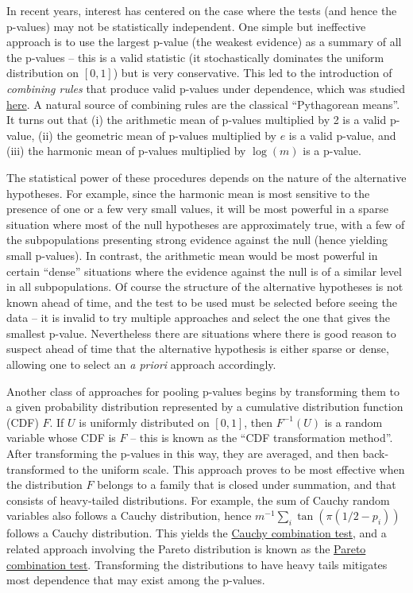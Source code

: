 In recent years, interest has centered on the case where the tests (and hence the p-values) may not be statistically independent. One simple but ineffective approach is to use the largest p-value (the weakest evidence) as a summary of all the p-values -- this is a valid statistic (it stochastically dominates the uniform distribution on $[0, 1]$) but is very conservative. This led to the introduction of \textit{combining rules} that produce valid p-values under dependence, which was studied \href{https://arxiv.org/pdf/1212.4966}{here}. A natural source of combining rules are the classical ``Pythagorean means''. It turns out that (i) the arithmetic mean of p-values multiplied by 2 is a valid p-value, (ii) the geometric mean of p-values multiplied by $e$ is a valid p-value, and (iii) the harmonic mean of p-values multiplied by $\log(m)$ is a p-value.

The statistical power of these procedures depends on the nature of the alternative hypotheses. For example, since the harmonic mean is most sensitive to the presence of one or a few very small values, it will be most powerful in a sparse situation where most of the null hypotheses are approximately true, with a few of the subpopulations presenting strong evidence against the null (hence yielding small p-values). In contrast, the arithmetic mean would be most powerful in certain ``dense'' situations where the evidence against the null is of a similar level in all subpopulations. Of course the structure of the alternative hypotheses is not known ahead of time, and the test to be used must be selected before seeing the data -- it is invalid to try multiple approaches and select the one that gives the smallest p-value. Nevertheless there are situations where there is good reason to suspect ahead of time that the alternative hypothesis is either sparse or dense, allowing one to select an \textit{a priori} approach accordingly.

Another class of approaches for pooling p-values begins by transforming them to a given probability distribution represented by a cumulative distribution function (CDF) $F$. If $U$ is uniformly distributed on $[0, 1]$, then $F^{-1}(U)$ is a random variable whose CDF is $F$ -- this is known as the ``CDF transformation method''. After transforming the p-values in this way, they are averaged, and then back-transformed to the uniform scale.  This approach proves to be most effective when the distribution $F$ belongs to a family that is closed under summation, and that consists of heavy-tailed distributions. For example, the sum of Cauchy random variables also follows a Cauchy distribution, hence $m^{-1}\sum_i \tan(\pi(1/2 - p_i))$ follows a Cauchy distribution. This yields the \href{https://arxiv.org/pdf/1808.09011}{Cauchy combination test}, and a related approach involving the Pareto distribution is known as the \href{https://arxiv.org/abs/2509.12066}{Pareto combination test}. Transforming the distributions to have heavy tails mitigates most dependence that may exist among the p-values.

